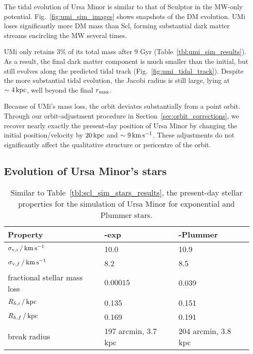The tidal evolution of Ursa Minor is similar to that of Sculptor in the
MW-only potential. Fig.~\ref{fig:umi_sim_images} shows snapshots of the
DM evolution. UMi loses significantly more DM mass than Scl, forming
substantial dark matter streams encircling the MW several times.

UMi only retains 3\% of its total mass after 9 Gyr
(Table~\ref{tbl:umi_sim_results}). As a result, the final dark matter
component is much smaller than the initial, but still evolves along the
predicted tidal track (Fig.~\ref{fig:umi_tidal_track}). Despite the more
substantial tidal evolution, the Jacobi radius is still large, lying at
\(\sim 4\,{\rm kpc}\), well beyond the final \(r_{\rm max}\).

Because of UMi's mass loss, the orbit deviates substantially from a
point orbit. Through our orbit-adjustment procedure in
Section~\ref{sec:orbit_corrections}, we recover nearly exactly the
present-day position of Ursa Minor by changing the initial
position/velocity by \(20\,{\rm kpc}\) and \(\sim 9\,{\rm km\,s^{-1}}\). These
adjustments do not significantly affect the qualitative structure or
pericentre of the orbit.

\subsection{Evolution of Ursa Minor's
stars}\label{evolution-of-ursa-minors-stars}

\begin{table*}[t]
\centering
\caption[Simulation results for Ursa Minor’s stars]{Similar to Table \ref{tbl:scl_sim_stars_results}, the present-day stellar properties for the simulation of Ursa Minor for exponential and Plummer stars. }
\label{tbl:umi_sim_stars_results}
\begin{tabular}{lll}
\toprule
Property & \smallperi{}-exp & \smallperi{}-Plummer\\
\midrule
$\sigma_{{\rm v}, i}\,/\,{\rm km\,s^{-1}}$ & 10.0 & 10.9\\
$\sigma_{{\rm v}, f}\,/\,{\rm km\,s^{-1}}$ & 8.2 & 8.5\\
fractional stellar mass loss & $0.00015$ & 0.039\\
$R_{h, i}\,/\,{\rm kpc}$ & 0.135 & 0.151\\
$R_{h, f}\,/\,{\rm kpc}$ & 0.169 & 0.191\\
break radius & 197 arcmin, 3.7 kpc & 204 arcmin, 3.8 kpc\\
\bottomrule
\end{tabular}
\end{table*}

